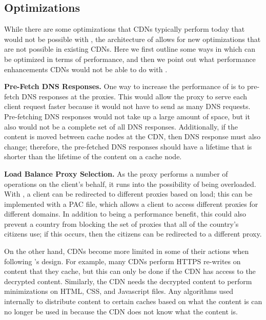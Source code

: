 \subsection{Optimizations}
\label{sec:optimizations}
While there are some optimizations that CDNs typically perform today that would not be possible with \system{}, the architecture 
of \system{} allows for new optimizations that are not possible in existing CDNs.  Here we first outline some ways in which \system{} 
can be optimized in terms of performance, and then we point out what performance enhancements CDNs would not be able to do with 
\system{}.

{\bf Pre-Fetch DNS Responses.} One way to increase the performance of \system{} is to pre-fetch DNS responses at 
the proxies.  This would allow the proxy to serve each client request faster because it would not have to send 
as many DNS requests.  Pre-fetching DNS responses would not take up a large amount of space, but it also 
would not be a complete set of all DNS responses.  Additionally, if the content is moved between cache nodes 
at the CDN, then DNS response must also change; therefore, the pre-fetched DNS responses should have a 
lifetime that is shorter than the lifetime of the content on a cache node.

{\bf Load Balance Proxy Selection.} As the proxy performs a number of operations on the client's behalf, it 
runs into the possibility of being overloaded.  With \system{}, a client can be redirected to different 
proxies based on load; this can be implemented with a PAC file, which allows 
a client to access different proxies for different domains.  In addition to being a performance benefit, 
this could also prevent a country from blocking the set of proxies that all of the country's citizens use; if 
this occurs, then the citizens can be redirected to a different proxy.   

On the other hand, CDNs become more limited in some of their actions when following \system{}'s design.  For example, 
many CDNs perform HTTPS re-writes on content that they cache, but this can only be done if the CDN has access to the 
decrypted content.  Similarly, the CDN needs the decrypted content to perform minimizations on HTML, CSS, and Javascript 
files.  Any algorithms used internally to distribute content to certain caches based on what the content is can no longer 
be used in \system{} because the CDN does not know what the content is. 
